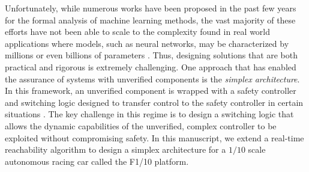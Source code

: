 \documentclass[manuscript,screen,review]{acmart}
\newcommand{\diego}[1]{\textcolor{purple}{\textbf{\underline{DM:}} #1}}
\begin{document}



Unfortunately, while numerous works have been proposed in the past few years for the formal analysis of machine learning methods, the vast majority of these efforts have not been able to scale to the complexity found in real world applications where models, such as neural networks, may be characterized by millions or even billions of parameters \cite{BallesterGoogLeNet,SimonyanVeryDeep}. Thus, designing solutions that are both practical and rigorous is extremely challenging. One approach that has enabled the assurance of systems with unverified components is the \textit{simplex architecture}. In this framework, an unverified component is wrapped with a safety controller and switching logic designed to transfer control to the safety controller in certain situations \cite{Bak2014}. The key challenge in this regime is to design a switching logic that allows the dynamic capabilities of the unverified, complex controller to be exploited without compromising safety. In this manuscript, we extend a real-time reachability algorithm \cite{Bak2014,Johnson2016} to design a simplex architecture for a $1/10$ scale autonomous racing car called the F1/10 platform. %
\end{document}
